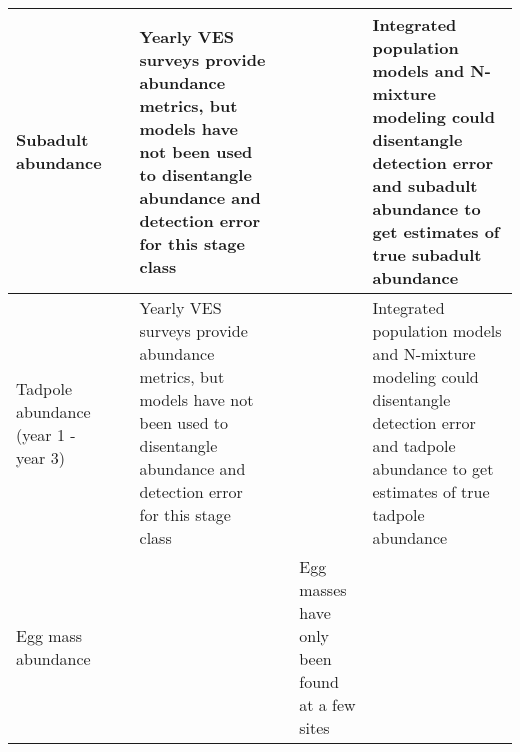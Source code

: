 \documentclass[letterpaper]{article}
\begin{document}
\begin{landscape}
\begin{longtable}{p{4 cm} | p{4 cm} | p{4 cm} | p{4 cm} | p{2 cm} | p{3 cm}}
Subadult abundance & & Yearly VES surveys provide abundance metrics, but models have not been used to disentangle abundance and detection error for this stage class  & & & Integrated population models and N-mixture modeling could disentangle detection error and subadult abundance to get estimates of true subadult abundance \\

\hline

Tadpole abundance (year 1 - year 3) & & Yearly VES surveys provide abundance metrics, but models have not been used to disentangle abundance and detection error for this stage class & & & Integrated population models and N-mixture modeling could disentangle detection error and tadpole abundance to get estimates of true tadpole abundance \\

\hline

Egg mass abundance & & & & Egg masses have only been found at a few sites \\

\hline

\end{longtable}


\end{landscape}
\end{document}
